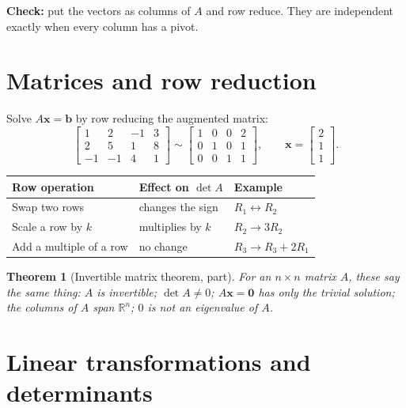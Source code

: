 \documentclass[11pt]{article}
\newtheorem*{theorem}{Theorem}
\begin{document}
\textbf{Check:} put the vectors as columns of $A$ and row reduce. They are
independent exactly when every column has a pivot.

\section{Matrices and row reduction}

Solve $A\mathbf{x} = \mathbf{b}$ by row reducing the augmented matrix:
\[
\left[\begin{array}{ccc|c}
1 & 2 & -1 & 3 \\
2 & 5 & 1 & 8 \\
-1 & -1 & 4 & 1
\end{array}\right]
\sim
\left[\begin{array}{ccc|c}
1 & 0 & 0 & 2 \\
0 & 1 & 0 & 1 \\
0 & 0 & 1 & 1
\end{array}\right],
\qquad
\mathbf{x} = \begin{bmatrix} 2 \\ 1 \\ 1 \end{bmatrix}.
\]

\begin{center}
\begin{tabular}{@{}lll@{}}
\toprule
Row operation & Effect on $\det A$ & Example \\
\midrule
Swap two rows & changes the sign & $R_1 \leftrightarrow R_2$ \\
Scale a row by $k$ & multiplies by $k$ & $R_2 \to 3R_2$ \\
Add a multiple of a row & no change & $R_3 \to R_3 + 2R_1$ \\
\bottomrule
\end{tabular}
\end{center}

\begin{theorem}[Invertible matrix theorem, part]
For an $n\times n$ matrix $A$, these say the same thing: $A$ is invertible;
$\det A \neq 0$; $A\mathbf{x}=\mathbf{0}$ has only the trivial solution; the
columns of $A$ span $\mathbb{R}^n$; $0$ is not an eigenvalue of $A$.
\end{theorem}

\section{Linear transformations and determinants}
\end{document}
